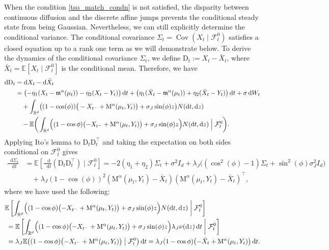 \documentclass{article}
\def\m{\mathfrak{m}}
\newcommand*\der{\mathop{}\!\mathrm{d}}
\numberwithin{equation}{section}
\begin{document}
When the condition \eqref{tso_match_condn} is not satisfied, the disparity between continuous diffusion and the discrete affine jumps prevents the conditional steady state from being Gaussian.
Nevertheless, we can still explicitly determine the conditional variance. The conditional covariance $\Sigma_t = \operatorname{Cov}(X_t \mid \mathcal{F}_t^0)$ satisfies a closed equation up to a rank one term as we will demonstrate below.
To derive the dynamics of the conditional covariance $\Sigma_t $, we define  $\mathrm{D}_t := X_t - \bar{X}_t$, where $\bar{X}_t = \mathbb{E}[X_t \mid \mathcal{F}_t^0]$ is the conditional mean. Therefore, we have
\begin{align*}
\der \mathrm{D}_t 
&= \der X_t - \der \bar{X}_t \\
&= \bigl( -\eta_1(X_t - \m^\alpha(\mu_t)) - \eta_2(X_t - Y_t) \bigr) \der t + \bigl(\eta_1(\bar{X}_t - \mathfrak{m}^\alpha(\mu_t)) + \eta_2(\bar{X}_t - Y_t) \bigr) \der t + \sigma \der W_t \\  
 & \quad+ \int_{\mathbb{R}^d}\bigl( (1-\cos(\phi))
\big(
-X_{t^-}+ \mathrm{M}^\alpha(\mu_t,Y_t)
\big) + \sigma_J\sin(\phi)z\bigr) N(\der t, \der z) \\
& \quad - \mathbb{E}\bigg( \int_{\mathbb{R}^d} 
\Bigl( (1-\cos\phi) \bigl( -X_{t^-} + \mathrm{M}^\alpha(\mu_t,Y_t) \bigr) + \sigma_J\sin(\phi)z \Bigr) N(\der t, \der z) \;\Big|\; \mathcal{F}_t^0 \bigg).
\end{align*}
Applying Ito's lemma to  $\mathrm{D}_t \mathrm{D}_t^\top$ and taking the expectation on both sides conditional on $\mathcal{F}_t^{0}$ gives
\begin{align}
 \frac{\der \Sigma_t}{\der t} 
&= \mathbb{E}\left[ \frac{\der}{\der t}(\mathrm{D}_t \mathrm{D}_t^\top) \mid \mathcal{F}_t^0 \right] 
=-2(\eta_1+\eta_2)\Sigma_t + \sigma^2 I_d + \lambda_J \big( (\cos^2(\phi) - 1)\Sigma_t + \sin^2(\phi)\sigma_J^2 I_d \big)\nonumber 
\\ & \quad + \lambda_J (1 - \cos(\phi))^2  (\mathrm{M}^\alpha(\mu_t, Y_t) -\bar{X}_t)(\mathrm{M}^\alpha(\mu_t, Y_t) -\bar{X}_t)^\top, 
\label{tso_eqn_covi}
\end{align}
where we have used the following: \begin{align}
&\mathbb{E}\left[ \int_{\mathbb{R}^d} 
\Bigl( (1-\cos\phi) \bigl( -X_{t^-} + \mathrm{M}^\alpha(\mu_t,Y_t) \bigr) + \sigma_J\sin(\phi)z \Bigr) N(\der t, \der z) \;\bigg|\; \mathcal{F}_t^0 \right] \nonumber \\
&\; = \mathbb{E}\left[ \int_{\mathbb{R}^d} 
\Bigl( (1-\cos\phi) \bigl( -X_{t^-} + \mathrm{M}^\alpha(\mu_t,Y_t) \bigr) + \sigma_J\sin(\phi)z \Bigr) \lambda_J \nu(\der z) \der t \;\bigg|\; \mathcal{F}_t^0 \right] \nonumber \\
&\; = \lambda_J \mathbb{E}\big( (1-\cos\phi) \bigl( -X_{t^-} + \mathrm{M}^\alpha(\mu_t,Y_t) \bigr) \;\big|\; \mathcal{F}_t^0 \big) \der t = \lambda_J (1-\cos\phi) \bigl( -\bar{X}_{t} + \mathrm{M}^\alpha(\mu_t,Y_t) \bigr) \der t.
\end{align}
\end{document}

